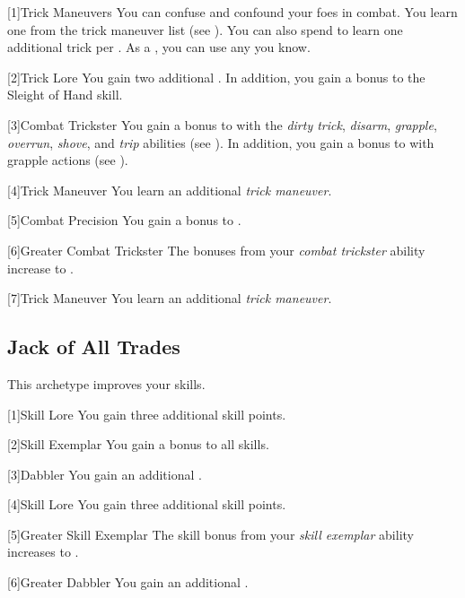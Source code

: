         [1]{Trick Maneuvers}
        You can confuse and confound your foes in combat.
        You learn one  from the trick maneuver list (see ).
        You can also spend  to learn one additional trick  per .
        As a , you can use any  you know.

        [2]{Trick Lore} You gain two additional .
        In addition, you gain a  bonus to the Sleight of Hand skill.

        [3]{Combat Trickster} You gain a  bonus to  with the \textit{dirty trick}, \textit{disarm}, \textit{grapple}, \textit{overrun}, \textit{shove}, and \textit{trip} abilities (see ).
        In addition, you gain a  bonus to  with grapple actions (see ).

        [4]{Trick Maneuver}
        You learn an additional \textit{trick maneuver}.

        [5]{Combat Precision} You gain a  bonus to .

        [6]{Greater Combat Trickster} The bonuses from your \textit{combat trickster} ability increase to .

        [7]{Trick Maneuver}
        You learn an additional \textit{trick maneuver}.

    \subsection{Jack of All Trades}
        This archetype improves your skills.

        [1]{Skill Lore} You gain three additional skill points.

        [2]{Skill Exemplar} You gain a  bonus to all skills.

        [3]{Dabbler} You gain an additional .

        [4]{Skill Lore} You gain three additional skill points.

        [5]{Greater Skill Exemplar} The skill bonus from your \textit{skill exemplar} ability increases to .

        [6]{Greater Dabbler} You gain an additional .

